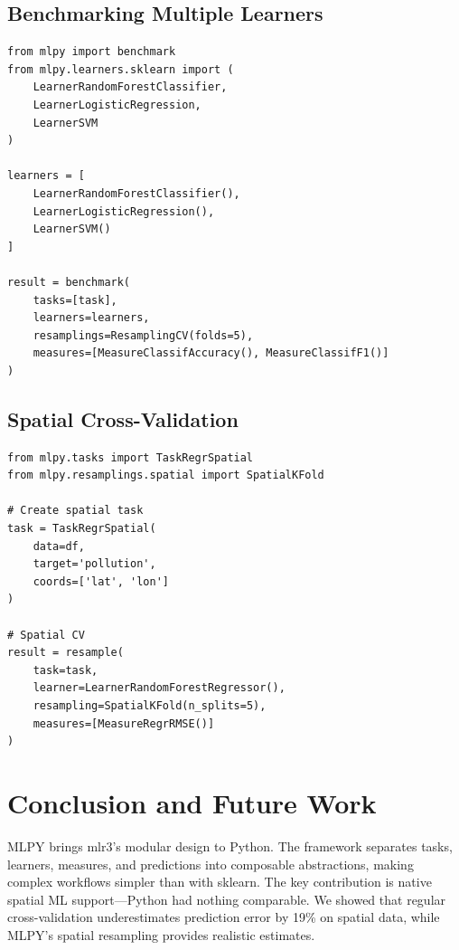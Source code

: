 \documentclass[twoside,11pt]{article}
\begin{document}
\subsection{Benchmarking Multiple Learners}

\begin{lstlisting}
from mlpy import benchmark
from mlpy.learners.sklearn import (
    LearnerRandomForestClassifier,
    LearnerLogisticRegression,
    LearnerSVM
)

learners = [
    LearnerRandomForestClassifier(),
    LearnerLogisticRegression(),
    LearnerSVM()
]

result = benchmark(
    tasks=[task],
    learners=learners,
    resamplings=ResamplingCV(folds=5),
    measures=[MeasureClassifAccuracy(), MeasureClassifF1()]
)
\end{lstlisting}

\subsection{Spatial Cross-Validation}

\begin{lstlisting}
from mlpy.tasks import TaskRegrSpatial
from mlpy.resamplings.spatial import SpatialKFold

# Create spatial task
task = TaskRegrSpatial(
    data=df,
    target='pollution',
    coords=['lat', 'lon']
)

# Spatial CV
result = resample(
    task=task,
    learner=LearnerRandomForestRegressor(),
    resampling=SpatialKFold(n_splits=5),
    measures=[MeasureRegrRMSE()]
)
\end{lstlisting}

\section{Conclusion and Future Work}
\label{sec:conclusion}

MLPY brings mlr3's modular design to Python. The framework separates tasks,
learners, measures, and predictions into composable abstractions, making complex
workflows simpler than with sklearn. The key contribution is native spatial ML
support---Python had nothing comparable. We showed that regular cross-validation
underestimates prediction error by 19\% on spatial data, while MLPY's spatial
resampling provides realistic estimates.
\end{document}
